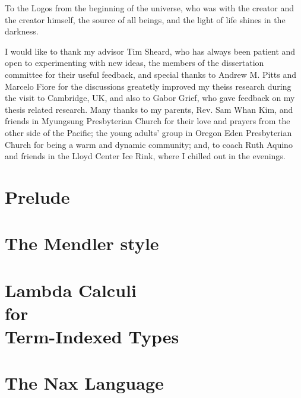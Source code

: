 \documentclass[12pt]{report}
\theoremstyle{definition}
\theoremstyle{remark}
\numberwithin{definition}{section}
\numberwithin{equation}{section}
\numberwithin{proposition}{section}
\numberwithin{conjecture}{section}
\numberwithin{theorem}{section}
\numberwithin{lemma}{section}
\numberwithin{corollary}{section}
\numberwithin{example}{section}
\numberwithin{remark}{section}
\begin{document}
To the Logos from the beginning of the universe, who was with the creator
and the creator himself, the source of all beings, and the light of life
shines in the darkness.

I would like to thank my advisor Tim Sheard, who has always been patient and
open to experimenting with new ideas, the members of the dissertation committee
for their useful feedback, and special thanks to Andrew M. Pitts and
Marcelo Fiore for the discussions greatetly improved my theiss research
during the visit to Cambridge, UK, and also to Gabor Grief, who gave feedback on
my thesis related research. Many thanks to my parents,
Rev. Sam Whan Kim, and friends in Myungsung Presbyterian Church for their
love and prayers from the other side of the Pacific; the young adults' group
in Oregon Eden Presbyterian Church for being a warm and dynamic community; and,
to coach Ruth Aquino and friends in the Lloyd Center Ice Rink, where I chilled
out in the evenings.

\afterpreface
\body

\part{Prelude}\label{part:Prelude}

\part{The Mendler style}\label{part:Mendler}

\part{Lambda Calculi \\ for \\ Term-Indexed Types}\label{part:Calculi}

\part{The Nax Language}\label{part:Nax}
\end{document}
